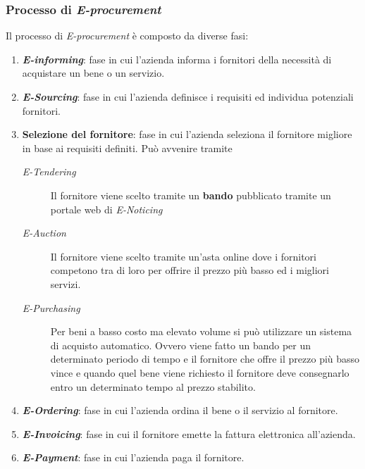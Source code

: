 {{        \subsubsection{Processo di \textit{E-procurement}}
            Il processo di \textit{E-procurement} è composto da diverse fasi:
            \begin{enumerate}
                \item \textbf{\textit{E-informing}}: fase in cui l'azienda informa i fornitori della necessità di acquistare un bene o un servizio.
                \item \textbf{\textit{E-Sourcing}}: fase in cui l'azienda definisce i requisiti ed individua potenziali fornitori.
                \item \textbf{Selezione del fornitore}: fase in cui l'azienda seleziona il fornitore migliore in base ai requisiti definiti. Può avvenire tramite
                    \begin{description}
                        \item[\textit{E-Tendering}] Il fornitore viene scelto tramite un \textbf{bando} pubblicato tramite un portale web di \textit{E-Noticing}
                        \item[\textit{E-Auction}] Il fornitore viene scelto tramite un'asta online dove i fornitori competono tra di loro per offrire il prezzo più basso ed i migliori servizi.
                        \item[\textit{E-Purchasing}] Per beni a basso costo ma elevato volume si può utilizzare un sistema di acquisto automatico. Ovvero viene fatto un bando per un determinato periodo di tempo e il fornitore che offre il prezzo più basso vince e quando quel bene viene richiesto il fornitore deve consegnarlo entro un determinato tempo al prezzo stabilito.
                    \end{description}
                \item \textbf{\textit{E-Ordering}}: fase in cui l'azienda ordina il bene o il servizio al fornitore.
                \item \textbf{\textit{E-Invoicing}}: fase in cui il fornitore emette la fattura elettronica all'azienda.
                \item \textbf{\textit{E-Payment}}: fase in cui l'azienda paga il fornitore.
            \end{enumerate}
}}
